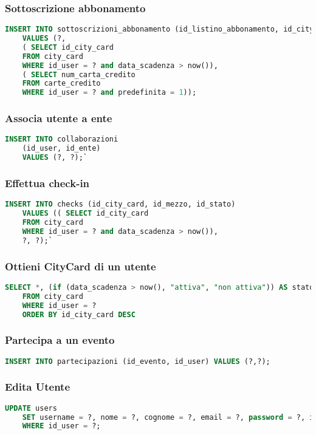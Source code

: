 \subsubsection{Sottoscrizione abbonamento}
\begin{lstlisting}[language=SQL]
	INSERT INTO sottoscrizioni_abbonamento (id_listino_abbonamento, id_city_card, num_carta_credito) 
	VALUES (?, 
	( SELECT id_city_card
	FROM city_card
	WHERE id_user = ? and data_scadenza > now()), 
	( SELECT num_carta_credito 
	FROM carte_credito
	WHERE id_user = ? and predefinita = 1));
\end{lstlisting}

\subsubsection{Associa utente a ente}
\begin{lstlisting}[language=SQL]
	INSERT INTO collaborazioni 
	(id_user, id_ente) 
	VALUES (?, ?);`
\end{lstlisting}

\subsubsection{Effettua check-in}
\begin{lstlisting}[language=SQL]
	INSERT INTO checks (id_city_card, id_mezzo, id_stato) 
	VALUES (( SELECT id_city_card
	FROM city_card
	WHERE id_user = ? and data_scadenza > now()), 
	?, ?);`
\end{lstlisting}

\subsubsection{Ottieni CityCard di un utente}
\begin{lstlisting}[language=SQL]
	SELECT *, (if (data_scadenza > now(), "attiva", "non attiva")) AS stato
	FROM city_card 
	WHERE id_user = ?
	ORDER BY id_city_card DESC
\end{lstlisting}

\subsubsection{Partecipa a un evento}
\begin{lstlisting}[language=SQL]
	INSERT INTO partecipazioni (id_evento, id_user) VALUES (?,?);
\end{lstlisting}

\subsubsection{Edita Utente}
\begin{lstlisting}[language=SQL]
	UPDATE users 
	SET username = ?, nome = ?, cognome = ?, email = ?, password = ?, indirizzo = ?, telefono = ?, cf = ? 
	WHERE id_user = ?;
\end{lstlisting}

